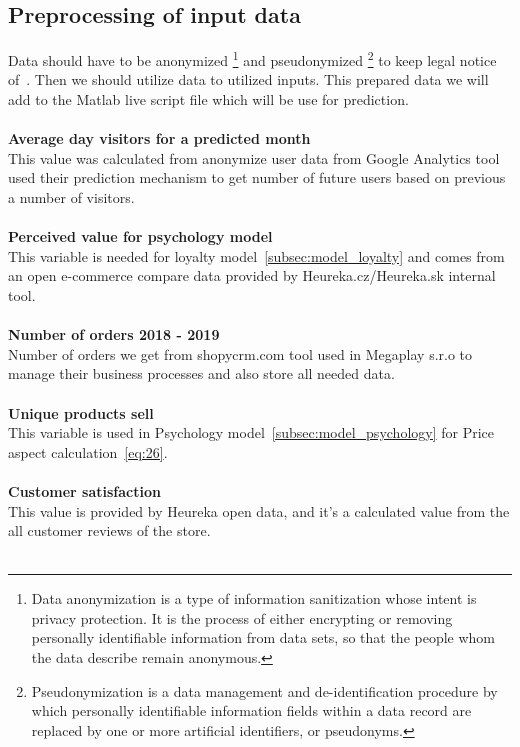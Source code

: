 \subsection{Preprocessing of input data} \label{subsec:preprocessing}
Data should have to be anonymized \footnote{Data anonymization is a type of information sanitization whose intent is privacy protection.
It is the process of either encrypting or removing personally identifiable information from data sets, so that
the people whom the data describe remain anonymous.} and pseudonymized \footnote{Pseudonymization is a data management
and de-identification procedure by which personally identifiable information fields within a data record are replaced
by one or more artificial identifiers, or pseudonyms.} to keep legal notice of~\cite{gdpr}.
Then we should utilize data to utilized inputs.
This prepared data we will add to the Matlab live script file which will be use for prediction.\\
\\
\textbf{Average day visitors for a predicted month}\\
This value was calculated from anonymize user data from Google Analytics tool used their prediction mechanism to get number of future users based on previous a number of visitors.\\
\\
\textbf{Perceived value for psychology model} \label{perceived}\\
This variable is needed for loyalty model~\ref{subsec:model_loyalty} and comes from an open e-commerce compare data provided by Heureka.cz/Heureka.sk internal tool.\\
\\
\textbf{Number of orders 2018 - 2019}\\
Number of orders we get from shopycrm.com tool used in Megaplay s.r.o to manage their business processes and also store all needed data.\\
\\
\textbf{Unique products sell}\\
This variable is used in Psychology model~\ref{subsec:model_psychology} for Price aspect calculation~\ref{eq:26}.\\
\\
\textbf{Customer satisfaction} \label{customerSat}\\
This value is provided by Heureka open data, and it's a calculated value from the all customer reviews of the store.\\
\\
